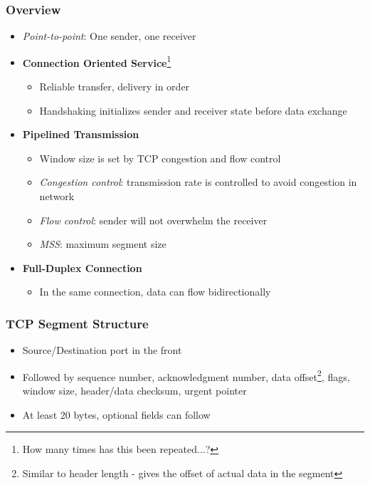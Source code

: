 \subsubsection{Overview}
\begin{itemize}
	\item \textit{Point-to-point}: One sender, one receiver
	\item \textbf{Connection Oriented Service}\footnote{How many times has this been repeated...?}
	\begin{itemize}
		\item Reliable transfer, delivery in order
		\item Handshaking initializes sender and receiver state before data exchange
	\end{itemize}
	\item \textbf{Pipelined Transmission}
	\begin{itemize}
		\item Window size is set by TCP congestion and flow control
		\item \textit{Congestion control}: transmission rate is controlled to avoid congestion in network
		\item \textit{Flow control}: sender will not overwhelm the receiver
		\item \textit{MSS}: maximum segment size
	\end{itemize}
	\item \textbf{Full-Duplex Connection}
	\begin{itemize}
		\item In the same connection, data can flow bidirectionally
	\end{itemize}
\end{itemize}

\subsubsection{TCP Segment Structure}
\begin{itemize}
	\item Source/Destination port in the front
	\item Followed by sequence number, acknowledgment number, data offset\footnote{Similar to header length - gives the offset of actual data in the segment}, flags, window size, header/data checksum, urgent pointer
	\item At least 20 bytes, optional fields can follow
\end{itemize}

